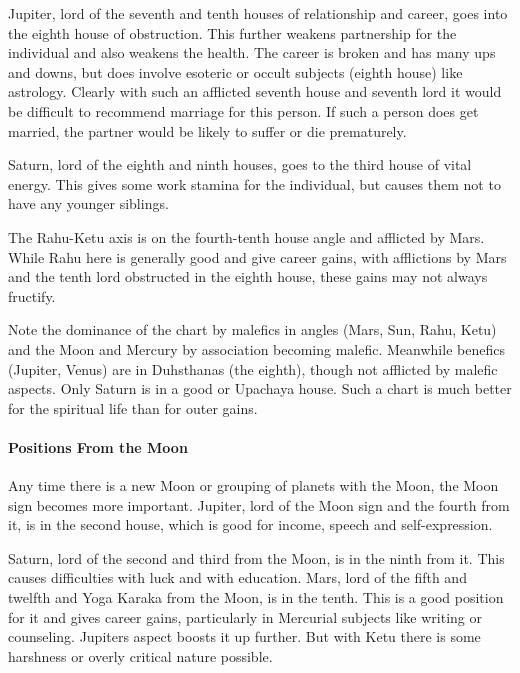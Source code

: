 

Jupiter, lord of the seventh and tenth houses of relationship and career, goes into the eighth house of obstruction. This further weakens partnership for the individual and also weakens the health. The career is broken and has many ups and downs, but does involve esoteric or occult subjects (eighth house) like astrology. Clearly with such an afflicted seventh house and seventh lord it would be difficult to recommend marriage for this person. If such a person does get married, the partner would be likely to suffer or die prematurely.

 

Saturn, lord of the eighth and ninth houses, goes to the third house of vital energy. This gives some work stamina for the individual, but causes them not to have any younger siblings.

 

The Rahu-Ketu axis is on the fourth-tenth house angle and afflicted by Mars. While Rahu here is generally good and give career gains, with afflictions by Mars and the tenth lord obstructed in the eighth house, these gains may not always fructify.

 

Note the dominance of the chart by malefics in angles (Mars, Sun, Rahu, Ketu) and the Moon and Mercury by association becoming malefic. Meanwhile benefics (Jupiter, Venus) are in Duhsthanas (the eighth), though not afflicted by malefic aspects. Only Saturn is in a good or Upachaya house. Such a chart is much better for the spiritual life than for outer gains.

 

\paragraph{Positions From the Moon}

 

Any time there is a new Moon or grouping of planets with the Moon, the Moon sign becomes more important. Jupiter, lord of the Moon sign and the fourth from it, is in the second house, which is good for income, speech and self-expression.

 

Saturn, lord of the second and third from the Moon, is in the ninth from it. This causes difficulties with luck and with education. Mars, lord of the fifth and twelfth and Yoga Karaka from the Moon, is in the tenth. This is a good position for it and gives career gains, particularly in Mercurial subjects like writing or counseling. Jupiters aspect boosts it up further. But with Ketu there is some harshness or overly critical nature possible.

